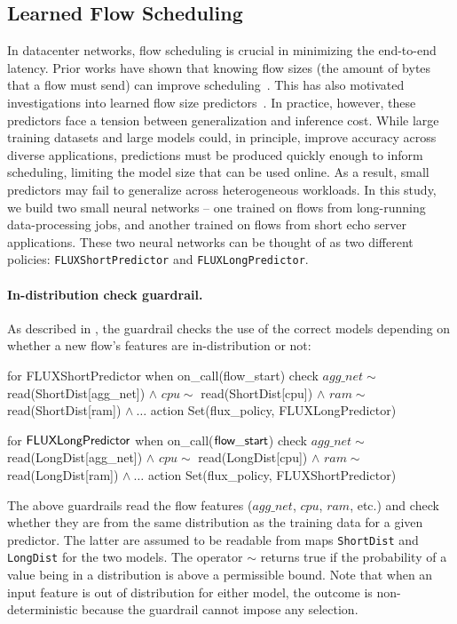 \subsection{Learned Flow Scheduling}\label{subsec:flux-case-study}

In datacenter networks, flow scheduling is crucial in minimizing the end-to-end latency.
Prior works have shown that knowing flow sizes (the amount of bytes that a flow must send) can improve scheduling~\cite{pfabric-sigcomm13,fastpass-sigcomm14,homa-sigcomm18}.
This has also motivated investigations into learned flow size predictors~\cite{flux-nsdi19}. In practice, however, these predictors face a tension between generalization and inference cost.
While large training datasets and large models could, in principle, improve accuracy across diverse applications, predictions must be produced quickly enough to inform scheduling, limiting the model size that can be used online. As a result, small predictors may fail to generalize across heterogeneous workloads.
In this study, we build two small neural networks -- one trained on flows from long-running data-processing jobs, and another trained on flows from short echo server applications.
These two neural networks can be thought of as two different policies: {\tt FLUXShortPredictor} and {\tt FLUXLongPredictor}.

\paragraph{In-distribution check guardrail.}
As described in , the guardrail checks the use of the correct models depending on whether a new flow's features  are in-distribution or not: %
\begin{dslbox}[title={Guardrail~\theguardcount: In-distribution checks for two flow size predictors}, glabel=lst:in-dist]
for FLUXShortPredictor
when on_call(flow_start)
check $agg\_net \sim$ read(ShortDist[agg_net]) $\wedge$
      $cpu \sim$ read(ShortDist[cpu]) $\wedge$
      $ram \sim$ read(ShortDist[ram]) $\wedge\ \dots$
action Set(flux_policy, FLUXLongPredictor)

for ${\sf FLUXLongPredictor}$
when on_call(${\sf flow\_start}$)
check $agg\_net \sim$ read(LongDist[agg_net]) $\wedge$
      $cpu \sim$ read(LongDist[cpu]) $\wedge$
      $ram \sim$ read(LongDist[ram]) $\wedge\ \dots$
action Set(flux_policy, FLUXShortPredictor)
\end{dslbox}
The above guardrails read the flow features ($agg\_net$, $cpu$, $ram$, etc.) and check whether they are from the same distribution as the training data for a given predictor.
The latter are assumed to be readable from maps {\tt ShortDist} and {\tt LongDist} for the two models.
The operator $\sim$ returns true if the probability of a value being in a distribution is above a permissible bound.
Note that when an input feature is out of distribution for either model, the outcome is non-deterministic because the guardrail cannot impose any selection. 

